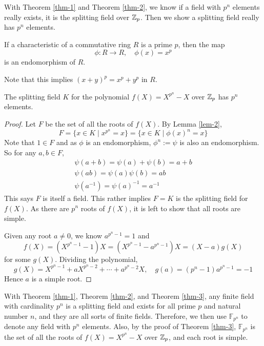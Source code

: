 With Theorem \ref{thm-1} and Theorem \ref{thm-2}, we know if a field with $p^n$ elements really exists, it is the splitting field over $\mathbb{Z}_p$. Then we show a splitting field really has $p^n$ elements.


\begin{lemma}
\label{lem-2}
If a characteristic of a commutative ring $R$ is a prime $p$, then the map
\[
	\phi: R \to R, \quad \phi(x) = x^p
\]
is an endomorphism of $R$.

\end{lemma}
Note that this implies $(x+y)^p = x^p + y^p$ in $R$.


\begin{theorem}
\label{thm-3}
	The splitting field $K$ for the polynomial $f(X) = X^{p^n} - X$ over $\mathbb{Z}_p$ has $p^n$ elements.
\end{theorem}

\begin{proof}

Let $F$ be the set of all the roots of $f(X)$. By Lemma \ref{lem-2},
\[
	F = \{x \in K \mid x^{p^n} = x\} = \{x \in K \mid \phi(x)^n = x\}
\]
Note that $1 \in F$ and as $\phi$ is an endomorphism, $\phi^n:=\psi$ is also an endomorphism. So for any $a,b \in F$,
\begin{gather*}
	\psi(a+b) = \psi(a)+\psi(b) = a + b \\
	\psi(ab) = \psi(a)\psi(b) = ab \\
	\psi(a^{-1}) = \psi(a)^{-1} = a^{-1}
\end{gather*}
This says $F$ is itself a field. This rather implies $F = K$ is the splitting field for $f(X)$. As there are $p^n$ roots of $f(X)$, it is left to show that all roots are simple.

Given any root $a \neq 0$, we know $a^{p^n - 1} = 1$ and
\[
	f(X) = (X^{p^n - 1} - 1) X = (X^{p^n - 1} - a^{p^n - 1}) X = (X-a)g(X)
\]
for some $g(X)$. Dividing the polynomial,
\[
	g(X) = X^{p^n-1} + aX^{p^n-2} + \cdots + a^{p^n-2}X, \quad g(a) = (p^n-1)a^{p^n - 1} = -1
\]
Hence $a$ is a simple root.

\end{proof}

With Theorem \ref{thm-1}, Theorem \ref{thm-2}, and Theorem \ref{thm-3}, any finite field with cardinality $p^n$ is a splitting field and exists for all prime $p$ and natural number $n$, and they are all sorts of finite fields. Therefore, we then use $\mathbb{F}_{p^n}$ to denote any field with $p^n$ elements. Also, by the proof of Theorem \ref{thm-3}, $\mathbb{F}_{p^n}$ is the set of all the roots of $f(X) = X^{p^n} - X$ over $\mathbb{Z}_p$, and each root is simple.


